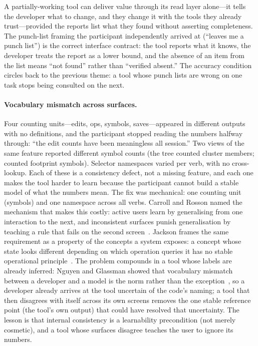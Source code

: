 A partially-working tool can deliver value through its read layer alone---it
tells the developer what to change, and they change it with the tools they
already trust---provided the reports list what they found without asserting
completeness. The punch-list framing the participant independently arrived at
(``leaves me a punch list'') is the correct interface contract: the tool
reports what it knows, the developer treats the report as a lower bound, and
the absence of an item from the list means ``not found'' rather than
``verified absent.'' The accuracy condition circles back to the previous theme:
a tool whose punch lists are wrong on one task stops being consulted on the
next.

\paragraph{Vocabulary mismatch across surfaces.}
Four counting units---edits, ops, symbols, saves---appeared in different
outputs with no definitions, and the participant stopped reading the numbers
halfway through: ``the edit counts have been meaningless all session.'' Two
views of the same feature reported different symbol counts (the tree counted
cluster members;  counted footprint symbols). Selector namespaces
varied per verb, with no cross-lookup. Each of these is a consistency defect,
not a missing feature, and each one makes the tool harder to learn because the
participant cannot build a stable model of what the numbers mean. The fix was
mechanical: one counting unit (symbols) and one namespace across all verbs.
Carroll and Rosson named the mechanism that makes this costly: active users
learn by generalising from one interaction to the next, and inconsistent surfaces
punish generalisation by teaching a rule that fails on the second
screen~\cite{carroll1987}. Jackson frames the same requirement as a property of
the concepts a system exposes: a concept whose state looks different depending on
which operation queries it has no stable operational
principle~\cite{jackson2021}. The problem compounds in a tool whose labels are
already inferred: Nguyen and Glassman showed that vocabulary mismatch between a
developer and a model is the norm rather than the exception~\cite{nguyen2024},
so a developer already arrives at the tool uncertain of the code's naming; a tool
that then disagrees with itself across its own screens removes the one stable
reference point (the tool's own output) that could have resolved that
uncertainty. The lesson is that internal consistency is a learnability
precondition (not merely cosmetic), and a tool whose surfaces disagree teaches
the user to ignore its numbers.

